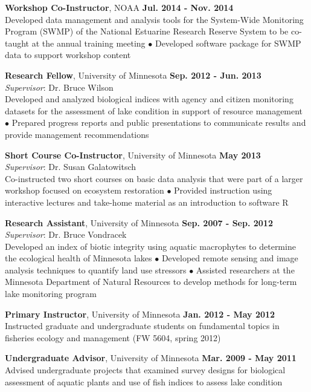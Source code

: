 \documentclass[letterpaper,12pt]{article}
\begin{document}
{\bf Workshop Co-Instructor}, NOAA \hfill {\bf Jul. 2014 - Nov. 2014}\\
Developed data management and analysis tools for the System-Wide Monitoring Program (SWMP) of the National Estuarine Research Reserve System to be co-taught at the annual training meeting $\bullet$ Developed software package for SWMP data to support workshop content

{\bf Research Fellow}, University of Minnesota \hfill {\bf Sep. 2012 - Jun. 2013} \\
\textit{Supervisor}: Dr. Bruce Wilson \\
Developed and analyzed biological indices with agency and citizen monitoring datasets for the assessment of lake condition in support of resource management $\bullet$ Prepared progress reports and public presentations to communicate results and provide management recommendations

{\bf Short Course Co-Instructor}, University of Minnesota \hfill {\bf May 2013} \\
\textit{Supervisor}: Dr. Susan Galatowitsch \\
Co-instructed two short courses on basic data analysis that were part of a larger workshop focused on ecosystem restoration $\bullet$ Provided instruction using interactive lectures and take-home material as an introduction to software R

{\bf Research Assistant}, University of Minnesota \hfill {\bf Sep. 2007 - Sep. 2012} \\
\textit{Supervisor}: Dr. Bruce Vondracek \\
Developed an index of biotic integrity using aquatic macrophytes to determine the ecological health of Minnesota lakes $\bullet$ Developed remote sensing and image analysis techniques to quantify land use stressors $\bullet$ Assisted researchers at the Minnesota Department of Natural Resources to develop methods for long-term lake monitoring program

{\bf Primary Instructor}, University of Minnesota \hfill {\bf Jan. 2012 - May 2012} \\
Instructed graduate and undergraduate students on fundamental topics in fisheries ecology and management (FW 5604, spring 2012)

{\bf Undergraduate Advisor}, University of Minnesota \hfill {\bf Mar. 2009 - May 2011} \\
Advised undergraduate projects that examined survey designs for biological assessment of aquatic plants and use of fish indices to assess lake condition 
\end{document}
